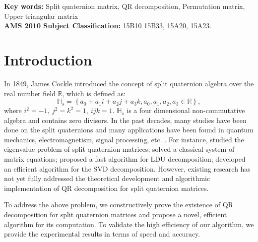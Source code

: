 \documentclass[12pt]{article}
\begin{document}
\noindent\textbf{Key words:}   Split quaternion matrix, QR decomposition, Permutation matrix, Upper triangular matrix
\\
\noindent\textbf{AMS 2010 Subject Classification:} 15B10 15B33, 15A20, 15A23.


\section{Introduction}
\vspace{-6pt}
In 1849, James Cockle \citep{Cockle1849} introduced the concept of split quaternion algebra over the real number field $\mathbb{R}$, which is defined as:
\begin{equation*}
    \mathbb{H}_s = \left\{ a_0 + a_1 i + a_2 j + a_3 k ,a_0, a_1, a_2, a_3 \in \mathbb{R}\right\}, 
\end{equation*} 
where $i^2 = -1,\ j^2 = k^2 = 1, \ ijk = 1$. $\mathbb{H}_s$ is a four dimensional non-commutative algebra and contains zero divisors. In the past decades, many studies have been done on the split quaternions \citep{AR2020,Yasemin2012,TJiang2015,Jiang2018,TJiang2018,Zhuo2020,Yang2020,mma2023,wang2024,Wang2021,Gang2024,yuan2017,Zhang2015} and  many applications have been found in quantum mechanics, electromagnetism, signal processing, etc. \citep{Gog2022, Hasebe2010, Le2022, Z2022, Wang2023}. For instance, \citep{Jiang2018} studied the eigenvalue problem of split quaternion matrices; \citep{wang2024} solved a classical system of matrix equations; 
 \citep{Wang2021} proposed a fast algorithm for LDU decomposition; \citep{Gang2024} developed an efficient algorithm for the SVD decomposition. However, existing research has not yet fully addressed the theoretical development and algorithmic implementation of QR decomposition for split quaternion matrices.

To address the above problem, we constructively prove the existence of QR decomposition for split quaternion matrices and propose a novel, efficient algorithm for its computation. To validate the high efficiency of our algorithm, we provide the experimental results in terms of speed and accuracy.
\end{document}

